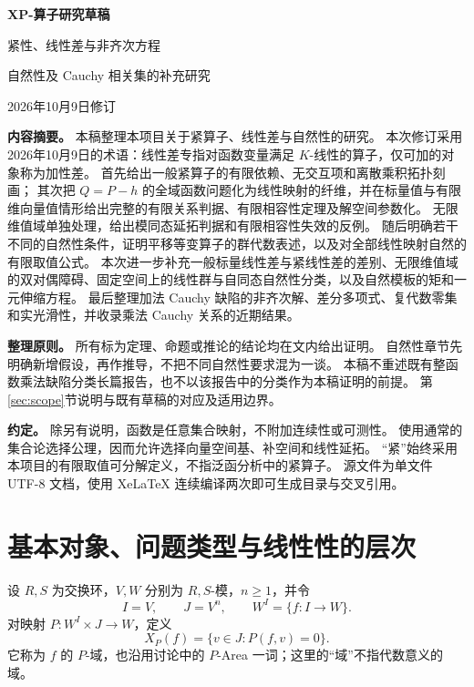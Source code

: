 \documentclass[UTF8,11pt,a4paper]{ctexart}
\theoremstyle{definition}
\begin{document}
\begin{titlepage}
\vspace*{20mm}
\begin{center}
{\LARGE\bfseries XP-算子研究草稿\par}
\vspace{7mm}
{\Large 紧性、线性差与非齐次方程\par}
\vspace{3mm}
{\large 自然性及 Cauchy 相关集的补充研究\par}
\vspace{10mm}
{2026年10月9日修订\par}
\end{center}
\vspace{10mm}
\noindent\textbf{内容摘要。}
本稿整理本项目关于紧算子、线性差与自然性的研究。
本次修订采用2026年10月9日的术语：线性差专指对函数变量满足 $K$-线性的算子，仅可加的对象称为加性差。
首先给出一般紧算子的有限依赖、无交互项和离散乘积拓扑刻画；
其次把 $Q=P-h$ 的全域函数问题化为线性映射的纤维，并在标量值与有限维向量值情形给出完整的有限关系判据、有限相容性定理及解空间参数化。
无限维值域单独处理，给出模同态延拓判据和有限相容性失效的反例。
随后明确若干不同的自然性条件，证明平移等变算子的群代数表述，以及对全部线性映射自然的有限取值公式。
本次进一步补充一般标量线性差与紧线性差的差别、无限维值域的双对偶障碍、固定空间上的线性群与自同态自然性分类，以及自然模板的矩和一元伸缩方程。
最后整理加法 Cauchy 缺陷的非齐次解、差分多项式、复代数零集和实光滑性，并收录乘法 Cauchy 关系的近期结果。

\medskip
\noindent\textbf{整理原则。}
所有标为定理、命题或推论的结论均在文内给出证明。
自然性章节先明确新增假设，再作推导，不把不同自然性要求混为一谈。
本稿不重述既有整函数乘法缺陷分类长篇报告，也不以该报告中的分类作为本稿证明的前提。
第\ref{sec:scope}节说明与既有草稿的对应及适用边界。

\medskip
\noindent\textbf{约定。}
除另有说明，函数是任意集合映射，不附加连续性或可测性。
使用通常的集合论选择公理，因而允许选择向量空间基、补空间和线性延拓。
“紧”始终采用本项目的有限取值可分解定义，不指泛函分析中的紧算子。
\vfill
\noindent\small 源文件为单文件 UTF-8 文档，使用 XeLaTeX 连续编译两次即可生成目录与交叉引用。
\end{titlepage}
\begingroup
\small
\setlength{\parskip}{0pt}
\tableofcontents
\endgroup
\clearpage

\section{基本对象、问题类型与线性性的层次}
设 $R,S$ 为交换环，$V,W$ 分别为 $R,S$-模，$n\ge1$，并令
\[
 I=V,\qquad J=V^n,\qquad W^I=\{f:I\to W\}.
\]
对映射 $P:W^I\times J\to W$，定义
\[
 X_P(f)=\{v\in J:P(f,v)=0\}.
\]
它称为 $f$ 的 $P$-域，也沿用讨论中的 $P$-Area 一词；这里的“域”不指代数意义的域。
\end{document}

